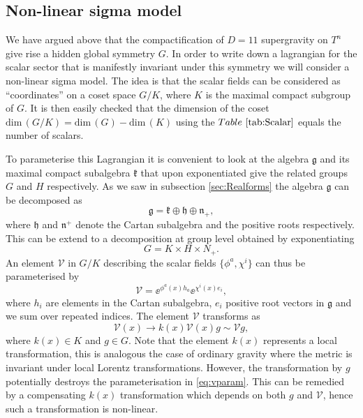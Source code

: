 \subsection{Non-linear sigma model\label{sec:NonLinearSigmaModels}}
We have argued above that the compactification of $D=11$ supergravity on $T^n$ give rise a hidden global symmetry $G$. In order to write down a lagrangian for the scalar sector that is manifestly invariant under this symmetry we will consider a non-linear sigma model. The idea is that the scalar fields can be considered as ``coordinates'' on a coset space $G/K$, where $K$ is the maximal compact subgroup of $G$. It is then easily checked that the dimension of the coset $\text{dim}\,(G/K)=\text{dim}\,(G)-\text{dim}\,(K)$ using the $\tabref{tab:Scalar}$ equals the number of scalars. 

To parameterise this Lagrangian it is convenient to look at the algebra $\mathfrak{g}$ and its maximal compact subalgebra $\mathfrak{k}$ that upon exponentiated give the related groups $G$ and $H$ respectively. As we saw in subsection \ref{sec:Realforms} the algebra $\mathfrak{g}$ can be decomposed as 
\begin{equation}
    \mathfrak{g} = \mathfrak{k}\oplus \mathfrak{h}\oplus\mathfrak{n}_+,
\end{equation}
where $\mathfrak{h}$ and $\mathfrak{n}^+$ denote the Cartan subalgebra and the positive roots respectively. This can be extend to a decomposition at group level obtained by exponentiating 
\begin{equation}
    G = K\times H\times N_+.
\end{equation}
An element $\mathcal{V}$ in $G/K$ describing the scalar fields $\{\phi^a,\chi^i\}$ can thus be parameterised by 
\begin{equation}\label{eq:vparam}
    \mathcal{V} = \ee^{\phi^a(x)h_a}\ee^{\chi^i(x)e_i},
\end{equation}
where $h_i$ are elements in the Cartan subalgebra, $e_i$ positive root vectors in $\mathfrak{g}$ and we sum over repeated indices. The element $\mathcal{V}$ transforms as 
\begin{equation}
    \mathcal{V}(x) \to k(x)\mathcal{V}(x)g\sim \mathcal{V}g,
\end{equation}
where $k(x)\in K$ and $g\in G$. Note that the element $k(x)$ represents a local transformation, this is analogous the case of ordinary gravity where the metric is invariant under local Lorentz transformations. However, the transformation by $g$ potentially destroys the parameterisation in \eqref{eq:vparam}. This can be remedied by a compensating $k(x)$ transformation which depends on both $g$ and $\mathcal{V}$, hence such a transformation is non-linear. 



